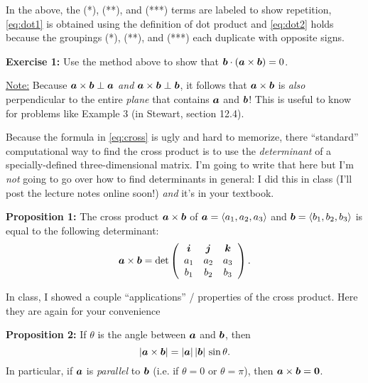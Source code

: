 \documentclass[12pt]{article}
\newcommand{\comps}[1]{\langle #1_1,#1_2,#1_3\rangle}
\begin{document}
	In the above, the (*), (**), and (***) terms are labeled to show repetition, \eqref{eq:dot1} is obtained using the definition of dot product and \eqref{eq:dot2} holds because the groupings (*), (**), and (***) each duplicate with opposite signs.\vspace{3mm}
	
	\noindent\textbf{Exercise 1:} Use the method above to show that $\boldsymbol{b}\cdot\left(\boldsymbol{a}\times\boldsymbol{b}\right)=0$.\vspace{3mm}
	
	\noindent \ul{Note:} Because $\boldsymbol{a}\times\boldsymbol{b}\perp\boldsymbol{a}$ \textit{and} $\boldsymbol{a}\times\boldsymbol{b}\perp\boldsymbol{b}$, it follows that $\boldsymbol{a}\times\boldsymbol{b}$ is \textit{also} perpendicular to the entire \textit{plane} that contains $\boldsymbol{a}$ and $\boldsymbol{b}$! This is useful to know for problems like Example 3 (in Stewart, section 12.4).\vspace{3mm}
	
	Because the formula in \eqref{eq:cross} is ugly and hard to memorize, there ``standard'' computational way to find the cross product is to use the \textit{determinant} of a specially-defined three-dimensional matrix. I'm going to write that here but I'm \textit{not} going to go over how to find determinants in general: I did this in class (I'll post the lecture notes online soon!) \textit{and} it's in your textbook.\vspace{6mm}
	
	\noindent\textbf{Proposition 1:} The cross product $\boldsymbol{a}\times\boldsymbol{b}$ of $\vect{a}=\comps{a}$ and $\vect{b}=\comps{b}$ is equal to the following determinant:
	$$\boldsymbol{a}\times\boldsymbol{b}=\det\left(\begin{array}{ccc}\boldsymbol{i} & \boldsymbol{j} & \boldsymbol{k}\\ a_1 & a_2 & a_3\\b_1 & b_2 & b_3\end{array}\right).$$\vspace{6mm}
	
	In class, I showed a couple ``applications'' / properties of the cross product. Here they are again for your convenience\vspace{6mm}
	
	\noindent\textbf{Proposition 2:} If $\theta$ is the angle between $\boldsymbol{a}$ and $\boldsymbol{b}$, then 
	$$|\boldsymbol{a}\times\boldsymbol{b}|=|\boldsymbol{a}|\,|\boldsymbol{b}|\,\sin\theta.$$
	\noindent In particular, if $\boldsymbol{a}$ is \textit{parallel} to $\boldsymbol{b}$ (i.e. if $\theta=0$ or $\theta=\pi$), then $\boldsymbol{a}\times\boldsymbol{b}=\boldsymbol{0}$.\vspace{6mm}
	
\end{document}
